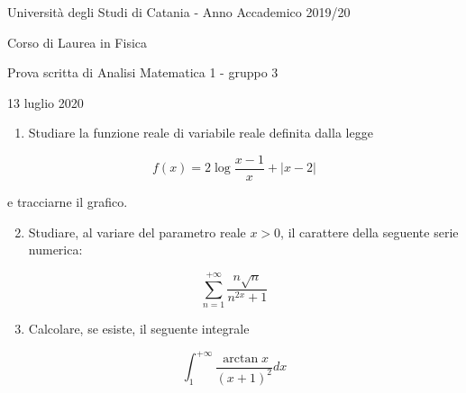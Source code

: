 \documentclass[10pt]{article}
\begin{document}
Università degli Studi di Catania - Anno Accademico 2019/20

Corso di Laurea in Fisica

Prova scritta di Analisi Matematica 1 - gruppo 3

13 luglio 2020

\begin{enumerate}
  \item Studiare la funzione reale di variabile reale definita dalla legge
\end{enumerate}

\[
f(x)=2 \log \frac{x-1}{x}+|x-2|
\]

e tracciarne il grafico.

\begin{enumerate}
  \setcounter{enumi}{1}
  \item Studiare, al variare del parametro reale \(x>0\), il carattere della seguente serie numerica:
\end{enumerate}

\[
\sum_{n=1}^{+\infty} \frac{n \sqrt{n}}{n^{2 x}+1}
\]

\begin{enumerate}
  \setcounter{enumi}{2}
  \item Calcolare, se esiste, il seguente integrale
\end{enumerate}

\[
\int_{1}^{+\infty} \frac{\arctan x}{(x+1)^{2}} d x
\]
\end{document}
